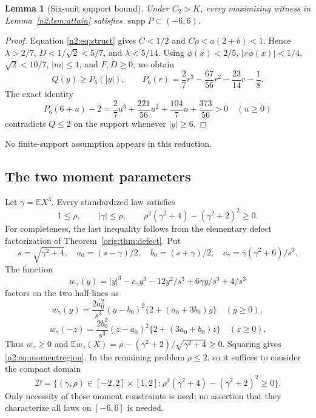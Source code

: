 \documentclass[11pt,a4paper]{article}
\numberwithin{equation}{section}
\newtheorem{lemma}[theorem]{Lemma}
\theoremstyle{definition}
\theoremstyle{remark}
\newcommand{\E}{\mathbb E}
\DeclareMathOperator{\supp}{supp}
\begin{document}
\begin{lemma}[Six-unit support bound]\label{n2:lem:support}
Under $C_2>K$, every maximizing witness in Lemma~\ref{n2:lem:attain} satisfies
$\supp P\subset(-6,6)$.
\end{lemma}
\begin{proof}
Equation \eqref{n2:eq:struct} gives $C<1/2$ and $C\rho<a(2+b)<1$.
Hence $\lambda>2/7$, $D<1/\sqrt2<5/7$, and $\lambda<5/14$.
Using $\phi(x)<2/5$, $|x\phi(x)|<1/4$, $\sqrt2<10/7$,
$|m|\le1$, and $F,D\ge0$, we obtain
\[
 Q(y)\ge P_6(|y|),\qquad
 P_6(r)=\frac27r^3-\frac{67}{56}r^2-\frac{23}{14}r-\frac18.
\]
The exact identity
\[
 P_6(6+u)-2
 =\frac27u^3+\frac{221}{56}u^2+\frac{104}{7}u+\frac{373}{56}>0
 \quad(u\ge0)
\]
contradicts $Q\le2$ on the support whenever $|y|\ge6$.
\end{proof}
No finite-support assumption appears in this reduction.

\subsection{The two moment parameters}
Let $\gamma=\E X^3$. Every standardized law satisfies
\begin{equation}\label{n2:eq:momentregion}
 1\le\rho,\qquad |\gamma|\le\rho,\qquad
 \rho^2(\gamma^2+4)-(\gamma^2+2)^2\ge0.
\end{equation}
For completeness, the last inequality follows from the elementary defect
factorization of Theorem~\ref{orig:thm:defect}. Put
\[
 s=\sqrt{\gamma^2+4},\quad a_0=(s-\gamma)/2,\quad b_0=(s+\gamma)/2,
 \quad c_\gamma=\gamma(\gamma^2+6)/s^3.
\]
The function
\[
 w_\gamma(y)=|y|^3-c_\gamma y^3-12y^2/s^3+6\gamma y/s^3+4/s^3
\]
factors on the two half-lines as
\[
 w_\gamma(y)=\frac{2a_0^2}{s^3}(y-b_0)^2\{2+(a_0+3b_0)y\}
 \quad(y\ge0),
\]
\[
 w_\gamma(-z)=\frac{2b_0^2}{s^3}(z-a_0)^2\{2+(3a_0+b_0)z\}
 \quad(z\ge0).
\]
Thus $w_\gamma\ge0$ and
$\E w_\gamma(X)=\rho-(\gamma^2+2)/\sqrt{\gamma^2+4}\ge0$.
Squaring gives \eqref{n2:eq:momentregion}. In the remaining problem $\rho\le2$,
so it suffices to consider the compact domain
\begin{equation}\label{n2:eq:D}
 \mathcal D=\{(\gamma,\rho)\in[-2,2]\times[1,2]:
 \rho^2(\gamma^2+4)-(\gamma^2+2)^2\ge0\}.
\end{equation}
Only necessity of these moment constraints is used; no assertion that they
characterize all laws on $[-6,6]$ is needed.
\end{document}

